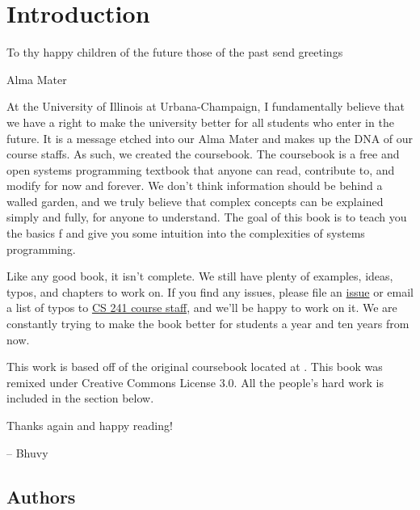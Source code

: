 \chapter{Introduction}

\epigraph{To thy happy children of the future those of the past send greetings}{Alma Mater}

At the University of Illinois at Urbana-Champaign, I fundamentally believe that we have a right to make the university better for all students who enter in the future.
It is a message etched into our Alma Mater and makes up the DNA of our course staffs.
As such, we created the coursebook.
The coursebook is a free and open systems programming textbook that anyone can read, contribute to, and modify for now and forever.
We don't think information should be behind a walled garden, and we truly believe that complex concepts can be explained simply and fully, for anyone to understand.
The goal of this book is to teach you the basics f and give you some intuition into the complexities of systems programming.

Like any good book, it isn't complete.
We still have plenty of examples, ideas, typos, and chapters to work on.
If you find any issues, please file an \href{https://github.com/illinois-cs241/coursebook/issues}{issue} or email a list of typos to \href{http://cs241.cs.illinois.edu/staff}{CS 241 course staff}, and we'll be happy to work on it.
We are constantly trying to make the book better for students a year and ten years from now.

This work is based off of the original coursebook located at .
This book was remixed under Creative Commons License 3.0.
All the people's hard work is included in the section below.

Thanks again and happy reading!

-- Bhuvy

\section{Authors}



